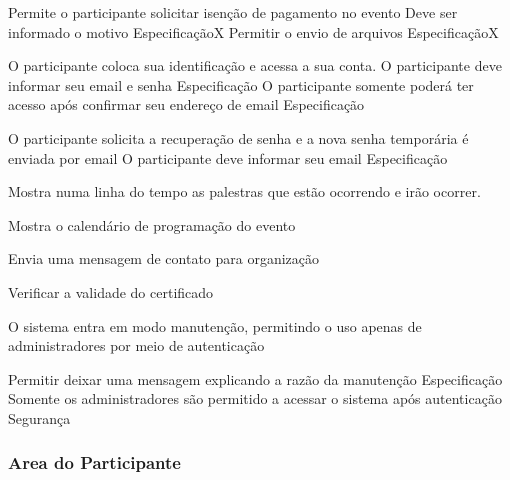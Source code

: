 \documentclass[12pt,a4paper]{article}
\begin{document}
				{Permite o participante solicitar isenção de pagamento no evento}
				{%
					  {Deve ser informado o motivo}
					  {Especificação}{}{X}%
					  {Permitir o envio de arquivos}
					  {Especificação}{}{X}%
				}
				
				{O participante coloca sua identificação e acessa a sua conta.}
				{%
					  {O participante deve informar seu email e senha}
					  {Especificação}{}{}%
					  {O participante somente poderá ter acesso após confirmar seu endereço de email}
					  {Especificação}{}{}%
				}
				
										
				{O participante solicita a recuperação de senha e a nova senha temporária é enviada por email}
				{%
					  {O participante deve informar seu email}
					  {Especificação}{}{}%
				}
				
				{Mostra numa linha do tempo as palestras que estão ocorrendo e irão ocorrer.}
				{%
				
				}
				
				{Mostra o calendário de programação do evento}
				{%
				
				}
				
				{Envia uma mensagem de contato para organização}
				{%
				
				}
				
				{Verificar a validade do certificado}
				{%
				
				}
				
				{O sistema entra em modo manutenção, permitindo o uso apenas de administradores por meio de autenticação}
				{%
						  {Permitir deixar uma mensagem explicando a razão da manutenção}
						  {Especificação}{}{}%
						  {Somente os administradores são permitido a acessar o sistema após autenticação}
						  {Segurança}{}{}%
				
				}
			
			\clearpage
			\subsubsection{Area do Participante}
			
\end{document}
